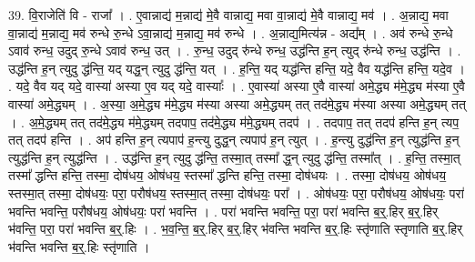 \documentclass[17pt]{extarticle}
\begin{document}
39. वि॒राजेति॑ वि - राजा᳚ । . ए॒वान्नाद्य॑ म॒न्नाद्य॑ मे॒वै वान्नाद्य॒ मवा वा॒न्नाद्य॑ मे॒वै वान्नाद्य॒ मव॑ । . अ॒न्नाद्य॒ मवा वा॒न्नाद्य॑ म॒न्नाद्य॒ मव॑ रुन्धे रु॒न्धे ऽवा॒न्नाद्य॑ म॒न्नाद्य॒ मव॑ रुन्धे । . अ॒न्नाद्य॒मित्य॑न्न - अद्य᳚म् । . अव॑ रुन्धे रु॒न्धे ऽवाव॑ रुन्ध॒ उदुद् रु॒न्धे ऽवाव॑ रुन्ध॒ उत् । . रु॒न्ध॒ उदुद् रु॑न्धे रुन्ध॒ उद्ध॑न्ति ह॒न् त्युद् रु॑न्धे रुन्ध॒ उद्ध॑न्ति । . उद्ध॑न्ति ह॒न् त्युदु द्ध॑न्ति॒ यद् यद्ध॒न् त्युदु द्ध॑न्ति॒ यत् । . ह॒न्ति॒ यद् यद्ध॑न्ति हन्ति॒ यदे॒ वैव यद्ध॑न्ति हन्ति॒ यदे॒व । . यदे॒ वैव यद् यदे॒ वास्या॑ अस्या ए॒व यद् यदे॒ वास्याः᳚ । . ए॒वास्या॑ अस्या ए॒वै वास्या॑ अमे॒द्ध्य म॑मे॒द्ध्य म॑स्या ए॒वै वास्या॑ अमे॒द्ध्यम् । . अ॒स्या॒ अ॒मे॒द्ध्य म॑मे॒द्ध्य म॑स्या अस्या अमे॒द्ध्यम् तत् तद॑मे॒द्ध्य म॑स्या अस्या अमे॒द्ध्यम् तत् । . अ॒मे॒द्ध्यम् तत् तद॑मे॒द्ध्य म॑मे॒द्ध्यम् तदपाप॒ तद॑मे॒द्ध्य म॑मे॒द्ध्यम् तदप॑ । . तदपाप॒ तत् तदप॑ हन्ति ह॒न् त्यप॒ तत् तदप॑ हन्ति । . अप॑ हन्ति ह॒न् त्यपाप॑ ह॒न्त्यु दुद्ध॒न् त्यपाप॑ ह॒न् त्युत् । . ह॒न्त्यु दुद्ध॑न्ति ह॒न् त्युद्ध॑न्ति ह॒न् त्युद्ध॑न्ति ह॒न् त्युद्ध॑न्ति । . उद्ध॑न्ति ह॒न् त्युदु द्ध॑न्ति॒ तस्मा॒त् तस्मा᳚ द्ध॒न् त्युदु द्ध॑न्ति॒ तस्मा᳚त् । . ह॒न्ति॒ तस्मा॒त् तस्मा᳚ द्धन्ति हन्ति॒ तस्मा॒ दोष॑धय॒ ओष॑धय॒ स्तस्मा᳚ द्धन्ति हन्ति॒ तस्मा॒ दोष॑धयः । . तस्मा॒ दोष॑धय॒ ओष॑धय॒ स्तस्मा॒त् तस्मा॒ दोष॑धयः॒ परा॒ परौष॑धय॒ स्तस्मा॒त् तस्मा॒ दोष॑धयः॒ परा᳚ । . ओष॑धयः॒ परा॒ परौष॑धय॒ ओष॑धयः॒ परा॑ भवन्ति भवन्ति॒ परौष॑धय॒ ओष॑धयः॒ परा॑ भवन्ति । . परा॑ भवन्ति भवन्ति॒ परा॒ परा॑ भवन्ति ब॒र्॒.हिर् ब॒र्॒.हिर् भ॑वन्ति॒ परा॒ परा॑ भवन्ति ब॒र्॒.हिः । . भ॒व॒न्ति॒ ब॒र्॒.हिर् ब॒र्॒.हिर् भ॑वन्ति भवन्ति ब॒र्॒.हिः स्तृ॑णाति स्तृणाति ब॒र्॒.हिर् भ॑वन्ति भवन्ति ब॒र्॒.हिः स्तृ॑णाति । \newline
\end{document}
